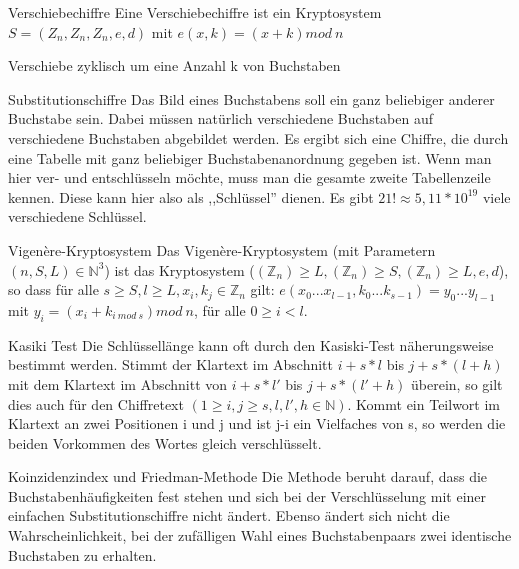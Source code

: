 \documentclass[avery5371, frame]{flashcards}
\begin{document}
\begin{flashcard}[Definition]{Verschiebechiffre}
    Eine Verschiebechiffre ist ein Kryptosystem $S=(Z_n,Z_n,Z_n,e,d)$ mit $e(x,k)=(x+k) mod\ n$

    Verschiebe zyklisch um eine Anzahl k von Buchstaben
\end{flashcard}

\begin{flashcard}[Definition]{Substitutionschiffre}
    Das Bild eines Buchstabens soll ein ganz beliebiger anderer Buchstabe sein. Dabei müssen natürlich verschiedene Buchstaben auf verschiedene Buchstaben abgebildet werden. Es ergibt sich eine Chiffre, die durch eine Tabelle mit ganz beliebiger Buchstabenanordnung gegeben ist.
    Wenn man hier ver- und entschlüsseln möchte, muss man die gesamte zweite Tabellenzeile kennen. Diese kann hier also als ,,Schlüssel'' dienen. Es gibt $21!\approx 5,11* 10^{19}$ viele verschiedene Schlüssel.
\end{flashcard}

\begin{flashcard}[Definition]{Vigenère-Kryptosystem}
    Das Vigenère-Kryptosystem (mit Parametern $(n,S,L)\in\mathbb{N}^3$) ist das Kryptosystem ($(\mathbb{Z}_n)\geq L,(\mathbb{Z}_n)\geq S,(\mathbb{Z}_n)\geq L,e,d$), so dass für alle $s\geq S,l\geq L,x_i,k_j\in\mathbb{Z}_n$ gilt: $e(x_0...x_{l-1},k_0 ...k_{s-1})=y_0 ...y_{l-1}$ mit $y_i=(x_i+k_{i\ mod\ s}) mod\ n$, für alle $0\geq i < l$.
\end{flashcard}

\begin{flashcard}[Definition]{Kasiki Test}
    Die Schlüssellänge kann oft durch den Kasiski-Test näherungsweise bestimmt werden. Stimmt der Klartext im Abschnitt $i+s*l$ bis $j+s*(l+h)$ mit dem Klartext im Abschnitt von $i+s*l'$ bis $j+s*(l'+h)$ überein, so gilt dies auch für den Chiffretext $(1\geq i,j\geq s,l,l',h\in\mathbb{N})$. Kommt ein Teilwort im Klartext an zwei Positionen i und j und ist j-i ein Vielfaches von s, so werden die beiden Vorkommen des Wortes gleich verschlüsselt.
\end{flashcard}

\begin{flashcard}[Definition]{Koinzidenzindex und Friedman-Methode}
    Die Methode beruht darauf, dass die Buchstabenhäufigkeiten fest stehen und sich bei der Verschlüsselung mit einer einfachen Substitutionschiffre nicht ändert. Ebenso ändert sich nicht die Wahrscheinlichkeit, bei der zufälligen Wahl eines Buchstabenpaars zwei identische Buchstaben zu erhalten.
\end{flashcard}
\end{document}
